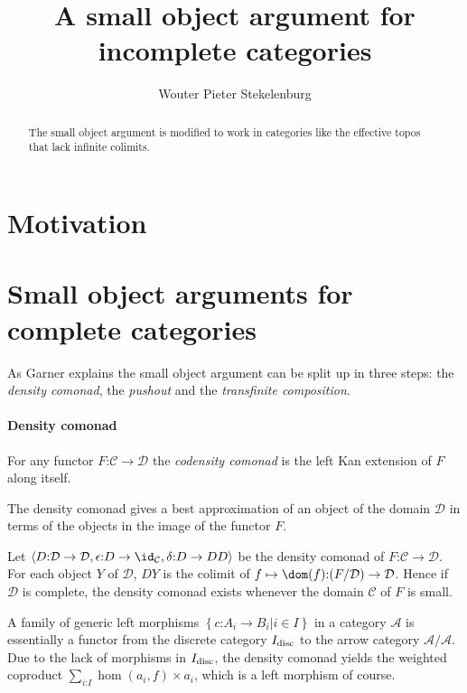 \documentclass{tac}
\title{A small object argument for incomplete categories}
\author{Wouter Pieter Stekelenburg}
\newcommand\keyword[1]{\emph{#1}\label{#1}}
\newcommand\cat\mathcal
\newcommand\of{\mathord:}
\newcommand\set[1]{\left\{#1\right\}}
\newcommand\tuplet[1]{\left\langle #1 \right\rangle}
\newcommand\disc{_{\rm disc}}
\begin{document}
\begin{abstract}
The small object argument %
is modified to work in categories like the effective topos %
that lack infinite colimits.
\end{abstract}

\maketitle

\section{Motivation}

\section{Small object arguments for complete categories}
As Garner explains %
the small object argument can be split up in three steps: the \emph{density comonad}, the \emph{pushout} and the \emph{transfinite composition}.

\paragraph{Density comonad}
\begin{definition}
For any functor $F\of \cat C\to \cat D$ the \keyword{codensity comonad} 
is the left Kan extension of $F$ along itself.
\end{definition}

The density comonad gives a best approximation of an object of the domain $\cat D$ in terms of the objects in the image of the functor $F$.
 
\begin{lemma} Let $\tuplet{D\of\cat D\to\cat D,\epsilon\of D\to \id_{
\cat C},\delta\of D \to DD}$ be the density comonad of $F\of\cat C\to\cat D$. For each object $Y$ of $\cat D$, $DY$ is the colimit of $f\mapsto\dom(f)\of (F/\cat D)\to \cat D$. Hence if $\cat D$ is complete, the density comonad exists whenever the domain $\cat C$ of $F$ is small.
\end{lemma}

A family of generic left morphisms $\set{c\of A_i\to B_i|i\in I}$ in a category $\cat A$ is essentially a functor from the discrete category $I\disc$ to the arrow category $\cat A/\cat A$. Due to the lack of morphisms in $I\disc$, the density comonad yields the weighted coproduct $\sum_{i\of I} \hom(a_i,f)\times a_i$, which is a left morphism of course.
\end{document}
